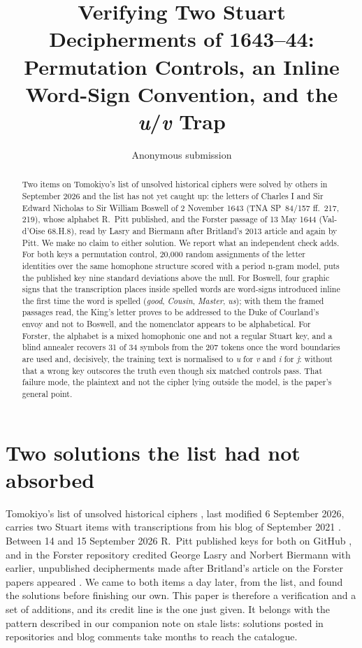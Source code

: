 \documentclass[11pt]{article}
\title{Verifying Two Stuart Decipherments of 1643--44: \\ Permutation Controls, an Inline Word-Sign Convention, and the \emph{u}/\emph{v} Trap}
\author{Anonymous submission}
\date{}
\begin{document}
\maketitle

\begin{abstract}
Two items on Tomokiyo's list of unsolved historical ciphers were solved by others in September 2026 and the list has not yet caught up: the letters of Charles I and Sir Edward Nicholas to Sir William Boswell of 2 November 1643 (TNA SP~84/157 ff.~217, 219), whose alphabet R.~Pitt published, and the Forster passage of 13 May 1644 (Val-d'Oise 68.H.8), read by Lasry and Biermann after Britland's 2013 article and again by Pitt. We make no claim to either solution. We report what an independent check adds. For both keys a permutation control, 20,000 random assignments of the letter identities over the same homophone structure scored with a period n-gram model, puts the published key nine standard deviations above the null. For Boswell, four graphic signs that the transcription places inside spelled words are word-signs introduced inline the first time the word is spelled (\emph{good}, \emph{Cousin}, \emph{Master}, \emph{us}); with them the framed passages read, the King's letter proves to be addressed to the Duke of Courland's envoy and not to Boswell, and the nomenclator appears to be alphabetical. For Forster, the alphabet is a mixed homophonic one and not a regular Stuart key, and a blind annealer recovers 31 of 34 symbols from the 207 tokens once the word boundaries are used and, decisively, the training text is normalised to \emph{u} for \emph{v} and \emph{i} for \emph{j}: without that a wrong key outscores the truth even though six matched controls pass. That failure mode, the plaintext and not the cipher lying outside the model, is the paper's general point.
\end{abstract}

\section{Two solutions the list had not absorbed}

Tomokiyo's list of unsolved historical ciphers , last modified 6 September 2026, carries two Stuart items with transcriptions from his blog of September 2021 \cite{Tomokiyo:boswellblog,Tomokiyo:forsterblog}. Between 14 and 15 September 2026 R.~Pitt published keys for both on GitHub \cite{Pitt:boswell,Pitt:forster}, and in the Forster repository credited George Lasry and Norbert Biermann with earlier, unpublished decipherments made after Britland's article on the Forster papers appeared \cite{Britland:2013}. We came to both items a day later, from the list, and found the solutions before finishing our own. This paper is therefore a verification and a set of additions, and its credit line is the one just given. It belongs with the pattern described in our companion note on stale lists: solutions posted in repositories and blog comments take months to reach the catalogue.
\end{document}
